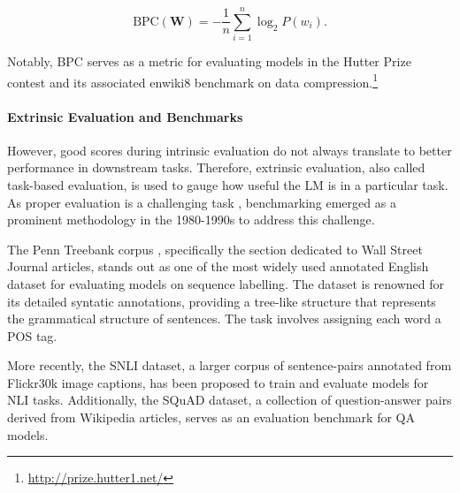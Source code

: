 \begin{equation}
    \text{BPC}(\bm{W}) = - \dfrac{1}{n} \sum_{i=1}^n \log_2 P(w_i).
\end{equation}

\noindent Notably, \ac{BPC} serves as a metric for evaluating models in the Hutter Prize contest and its associated enwiki8 benchmark on data compression.\footnote{\url{http://prize.hutter1.net/}}

\paragraph{Extrinsic Evaluation and Benchmarks} However, good scores during intrinsic evaluation do not always translate to better performance in downstream tasks. Therefore, extrinsic evaluation, also called task-based evaluation, is used to gauge how useful the \ac{LM} is in a particular task. As proper evaluation is a challenging task \citep{jones2005some}, benchmarking emerged as a prominent methodology in the 1980-1990s to address this challenge. 

The Penn Treebank corpus \citep{marcus1993building}, specifically the section dedicated to Wall Street Journal articles, stands out as one of the most widely used annotated English dataset for evaluating models on sequence labelling. The dataset is renowned for its detailed syntatic annotations, providing a tree-like structure that represents the grammatical structure of sentences. The task involves assigning each word a \ac{POS} tag. 

More recently, the \ac{SNLI} dataset, a larger corpus of sentence-pairs annotated from Flickr30k image captions, has been proposed to train and evaluate models for \ac{NLI} tasks. Additionally, the \ac{SQuAD} \citep{rajpurkar2016squad} dataset, a collection of question-answer pairs derived from Wikipedia articles, serves as an evaluation benchmark for \ac{QA} models. 

